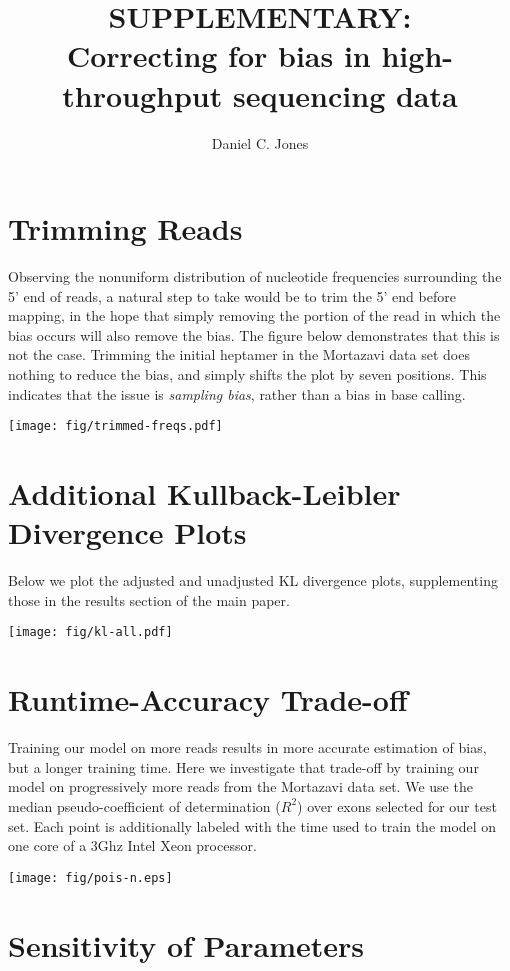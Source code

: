\documentclass[letterpaper]{article}
\title{SUPPLEMENTARY:\\Correcting for bias in high-throughput sequencing data}
\author{Daniel C. Jones}
\begin{document}


\section{Trimming Reads}

Observing the nonuniform distribution of nucleotide frequencies surrounding the
5' end of reads, a natural step to take would be to trim the 5' end before mapping,
in the hope that simply removing the portion of the read in which the bias
occurs will also remove the bias. The figure below demonstrates that this is not
the case. Trimming the initial heptamer in the Mortazavi data set does nothing to
reduce the bias, and simply shifts the plot by seven positions. This indicates
that the issue is \emph{sampling bias}, rather than a bias in base calling.


\begin{center}
\texttt{[image: fig/trimmed-freqs.pdf]}
\end{center}



\section{Additional Kullback-Leibler Divergence Plots}

Below we plot the adjusted and unadjusted KL divergence plots, supplementing
those in the results section of the main paper.


\texttt{[image: fig/kl-all.pdf]}




\section{Runtime-Accuracy Trade-off}

Training our model on more reads results in more accurate estimation of bias,
but a longer training time. Here we investigate that trade-off by training our
model on progressively more reads from the Mortazavi data set. We use the
median pseudo-coefficient of determination ($R^2$) over exons selected for our
test set. Each point is additionally labeled with the time used to train the
model on one core of a 3Ghz Intel Xeon processor.

\texttt{[image: fig/pois-n.eps]}


\section{Sensitivity of Parameters}
\end{document}
